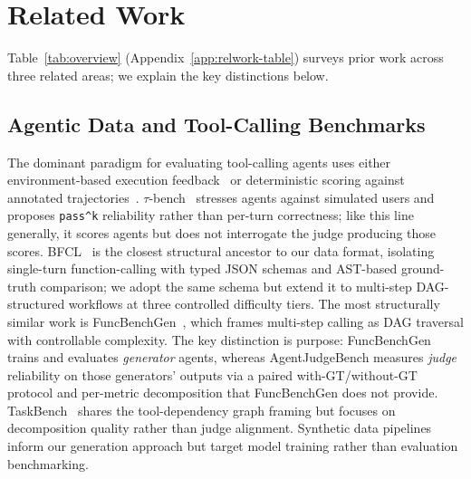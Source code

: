 \section{Related Work}
Table~\ref{tab:overview} (Appendix~\ref{app:relwork-table}) surveys prior work across three related areas; we explain the key distinctions below.

\subsection{Agentic Data and Tool-Calling Benchmarks}
The dominant paradigm for evaluating tool-calling agents uses either environment-based execution feedback~\citep{zhou2024webarena,drouin2024workarena,trivedi2024appworld,yao2024taubench} or deterministic scoring against annotated trajectories~\citep{deng2023mind2web,xu2025agenttrek,patil2025bfcl}. $\tau$-bench~\citep{yao2024taubench} stresses agents against simulated users and proposes \texttt{pass\textasciicircum k} reliability rather than per-turn correctness; like this line generally, it scores agents but does not interrogate the judge producing those scores. BFCL~\citep{patil2025bfcl} is the closest structural ancestor to our data format, isolating single-turn function-calling with typed JSON schemas and AST-based ground-truth comparison; we adopt the same schema but extend it to multi-step DAG-structured workflows at three controlled difficulty tiers. The most structurally similar work is FuncBenchGen~\citep{maekawa2025funcbenchgen}, which frames multi-step calling as DAG traversal with controllable complexity. The key distinction is purpose: FuncBenchGen trains and evaluates \emph{generator} agents, whereas AgentJudgeBench measures \emph{judge} reliability on those generators' outputs via a paired with-GT/without-GT protocol and per-metric decomposition that FuncBenchGen does not provide. TaskBench~\citep{shen2024taskbench} shares the tool-dependency graph framing but focuses on decomposition quality rather than judge alignment. Synthetic data pipelines~\citep{wang2023selfinstruct,xu2025magpie,cui2024ultrafeedback} inform our generation approach but target model training rather than evaluation benchmarking.

